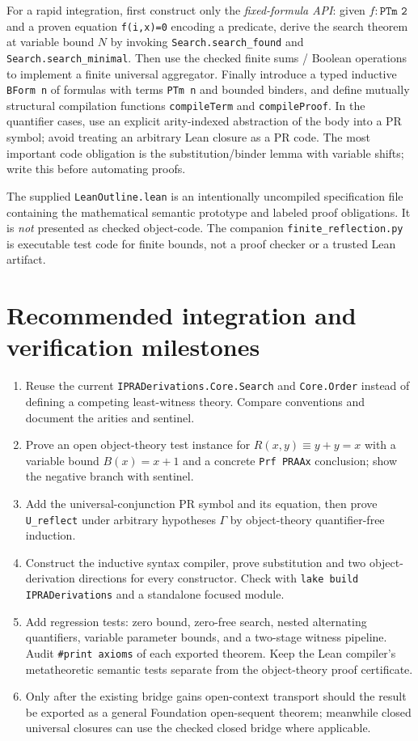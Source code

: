 \documentclass[11pt]{article}
\begin{document}
For a rapid integration, first construct only the \emph{fixed-formula API}: given $f:\texttt{PTm 2}$ and a proven equation \texttt{f(i,x)=0} encoding a predicate, derive the search theorem at variable bound $N$ by invoking \texttt{Search.search\_found} and \texttt{Search.search\_minimal}. Then use the checked finite sums / Boolean operations to implement a finite universal aggregator. Finally introduce a typed inductive \texttt{BForm n} of formulas with terms \texttt{PTm n} and bounded binders, and define mutually structural compilation functions \texttt{compileTerm} and \texttt{compileProof}. In the quantifier cases, use an explicit arity-indexed abstraction of the body into a PR symbol; avoid treating an arbitrary Lean closure as a PR code. The most important code obligation is the substitution/binder lemma with variable shifts; write this before automating proofs.

The supplied \texttt{LeanOutline.lean} is an intentionally uncompiled specification file containing the mathematical semantic prototype and labeled proof obligations. It is \emph{not} presented as checked object-code. The companion \texttt{finite\_reflection.py} is executable test code for finite bounds, not a proof checker or a trusted Lean artifact.

\section{Recommended integration and verification milestones}
\begin{enumerate}[leftmargin=*]
\item Reuse the current \texttt{IPRADerivations.Core.Search} and \texttt{Core.Order} instead of defining a competing least-witness theory. Compare conventions and document the arities and sentinel.
\item Prove an open object-theory test instance for $R(x,y)\equiv y+y=x$ with a variable bound $B(x)=x+1$ and a concrete \texttt{Prf PRAAx} conclusion; show the negative branch with sentinel.
\item Add the universal-conjunction PR symbol and its equation, then prove \texttt{U\_reflect} under arbitrary hypotheses $\Gamma$ by object-theory quantifier-free induction.
\item Construct the inductive syntax compiler, prove substitution and two object-derivation directions for every constructor. Check with \texttt{lake build IPRADerivations} and a standalone focused module.
\item Add regression tests: zero bound, zero-free search, nested alternating quantifiers, variable parameter bounds, and a two-stage witness pipeline. Audit \texttt{\#print axioms} of each exported theorem. Keep the Lean compiler's metatheoretic semantic tests separate from the object-theory proof certificate.
\item Only after the existing bridge gains open-context transport should the result be exported as a general Foundation open-sequent theorem; meanwhile closed universal closures can use the checked closed bridge where applicable.
\end{enumerate}
\end{document}
